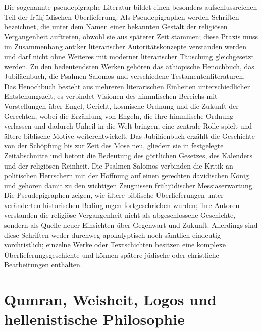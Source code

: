 \documentclass[fontsize=12pt]{mybib}
\begin{document}
Die sogenannte pseudepigraphe Literatur bildet einen besonders aufschlussreichen Teil der frühjüdischen Überlieferung. Als Pseudepigraphen werden Schriften bezeichnet, die unter dem Namen einer bekannten Gestalt der religiösen Vergangenheit auftreten, obwohl sie aus späterer Zeit stammen; diese Praxis muss im Zusammenhang antiker literarischer Autoritätskonzepte verstanden werden und darf nicht ohne Weiteres mit moderner literarischer Täuschung gleichgesetzt werden. Zu den bedeutendsten Werken gehören das äthiopische Henochbuch, das Jubiläenbuch, die Psalmen Salomos und verschiedene Testamentenliteraturen. Das Henochbuch besteht aus mehreren literarischen Einheiten unterschiedlicher Entstehungszeit; es verbindet Visionen des himmlischen Bereichs mit Vorstellungen über Engel, Gericht, kosmische Ordnung und die Zukunft der Gerechten, wobei die Erzählung von Engeln, die ihre himmlische Ordnung verlassen und dadurch Unheil in die Welt bringen, eine zentrale Rolle spielt und ältere biblische Motive weiterentwickelt. Das Jubiläenbuch erzählt die Geschichte von der Schöpfung bis zur Zeit des Mose neu, gliedert sie in festgelegte Zeitabschnitte und betont die Bedeutung des göttlichen Gesetzes, des Kalenders und der religiösen Reinheit. Die Psalmen Salomos verbinden die Kritik an politischen Herrschern mit der Hoffnung auf einen gerechten davidischen König und gehören damit zu den wichtigen Zeugnissen frühjüdischer Messiaserwartung. Die Pseudepigraphen zeigen, wie ältere biblische Überlieferungen unter veränderten historischen Bedingungen fortgeschrieben wurden; ihre Autoren verstanden die religiöse Vergangenheit nicht als abgeschlossene Geschichte, sondern als Quelle neuer Einsichten über Gegenwart und Zukunft. Allerdings sind diese Schriften weder durchweg apokalyptisch noch sämtlich eindeutig vorchristlich; einzelne Werke oder Textschichten besitzen eine komplexe Überlieferungsgeschichte und können spätere jüdische oder christliche Bearbeitungen enthalten.

\section{Qumran, Weisheit, Logos und hellenistische Philosophie}
\end{document}
